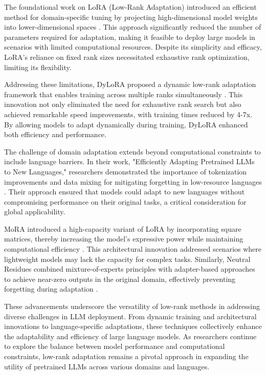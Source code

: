 \documentclass[conference]{IEEEtran}
\begin{document}
The foundational work on LoRA (Low-Rank Adaptation) introduced an efficient method for domain-specific tuning by projecting high-dimensional model weights into lower-dimensional spaces \cite{b1}. This approach significantly reduced the number of parameters required for adaptation, making it feasible to deploy large models in scenarios with limited computational resources. Despite its simplicity and efficacy, LoRA's reliance on fixed rank sizes necessitated exhaustive rank optimization, limiting its flexibility.

Addressing these limitations, DyLoRA proposed a dynamic low-rank adaptation framework that enables training across multiple ranks simultaneously \cite{b2}. This innovation not only eliminated the need for exhaustive rank search but also achieved remarkable speed improvements, with training times reduced by 4-7x. By allowing models to adapt dynamically during training, DyLoRA enhanced both efficiency and performance.

The challenge of domain adaptation extends beyond computational constraints to include language barriers. In their work, "Efficiently Adapting Pretrained LLMs to New Languages," researchers demonstrated the importance of tokenization improvements and data mixing for mitigating forgetting in low-resource languages \cite{b3}. Their approach ensured that models could adapt to new languages without compromising performance on their original tasks, a critical consideration for global applicability.

MoRA introduced a high-capacity variant of LoRA by incorporating square matrices, thereby increasing the model's expressive power while maintaining computational efficiency \cite{b4}. This architectural innovation addressed scenarios where lightweight models may lack the capacity for complex tasks. Similarly, Neutral Residues combined mixture-of-experts principles with adapter-based approaches to achieve near-zero outputs in the original domain, effectively preventing forgetting during adaptation \cite{b5}.

These advancements underscore the versatility of low-rank methods in addressing diverse challenges in LLM deployment. From dynamic training and architectural innovations to language-specific adaptations, these techniques collectively enhance the adaptability and efficiency of large language models. As researchers continue to explore the balance between model performance and computational constraints, low-rank adaptation remains a pivotal approach in expanding the utility of pretrained LLMs across various domains and languages.
\end{document}

